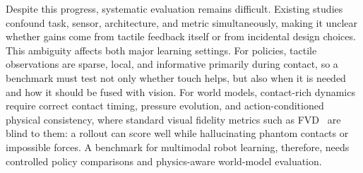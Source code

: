 \documentclass{article}
\begin{document}
Despite this progress, systematic evaluation remains difficult. Existing studies confound task, sensor, architecture, and metric simultaneously, making it unclear whether gains come from tactile feedback itself or from incidental design choices.
This ambiguity affects both major learning settings. 
For policies, tactile observations are sparse, local, and informative primarily during contact, so a benchmark must test not only whether touch helps, but also when it is needed and how it should be fused with vision. 
For world models, contact-rich dynamics require correct contact timing, pressure evolution, and action-conditioned physical consistency, where standard visual fidelity metrics such as FVD~\citep{unterthiner2018fvd} are blind to them: a rollout can score well while hallucinating phantom contacts or impossible forces.
A benchmark for multimodal robot learning, therefore, needs controlled policy comparisons and physics-aware world-model evaluation.
\end{document}

